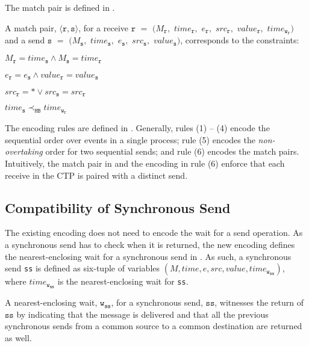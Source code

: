The match pair is defined in .
\begin{definition} \label{def:mp}
A match pair, $\langle\mathtt{r}, \mathtt{s}\rangle$, for a receive $\mathtt{r}$ $=$ $(M_\mathtt{r},$ $\mathit{time}_\mathtt{r},$ $e_\mathtt{r},$ $src_\mathtt{r},$ $\mathit{value}_\mathtt{r},$ $\mathit{time}_{\mathtt{w}_\mathtt{r}})$ and a send $\mathtt{s}$ $=$ $(M_\mathtt{s},$ $\mathit{time}_\mathtt{s},$ $e_\mathtt{s},$ $src_\mathtt{s},$ $\mathit{value}_\mathtt{s})$, corresponds to the constraints:
\begin{compactenum}
\item $M_{\mathtt{r}} = \mathit{time}_{\mathtt{s}} \wedge M_{\mathtt{s}} = \mathit{time}_{\mathtt{r}}$
\item $e_{\mathtt{r}} = e_{\mathtt{s}} \wedge \mathit{value}_{\mathtt{r}} = \mathit{value}_{\mathtt{s}}$
\item $src_\mathtt{r} = \ast \vee src_\mathtt{s} = src_\mathtt{r}$
\item $\mathit{time}_{\mathtt{s}} \prec_\mathtt{HB} \mathit{time}_{\mathtt{w_r}}$
\end{compactenum}
\end{definition}

The encoding rules are defined in . Generally, rules (1) -- (4) encode the sequential order over events in a single process; rule (5) encodes the \emph{non-overtaking} order for two sequential sends; and rule (6) encodes the match pairs. Intuitively, the match pair in  and the encoding in rule (6) enforce that each receive in the CTP is paired with a distinct send. 

\setcounter{equation}{0}
\encodingptp

\subsection{Compatibility of Synchronous Send}

The existing encoding does not need to encode the wait for a send operation. As a synchronous send has to check when it is returned, the new encoding defines the nearest-enclosing wait for a synchronous send in . As such, a synchronous send \texttt{ss} is defined as six-tuple of variables $(M,\mathit{time},e,\mathit{src},\mathit{value},\mathit{time}_\mathtt{w_{ss}})$, where $\mathit{time}_\mathtt{w_{ss}}$ is the nearest-enclosing wait for \texttt{ss}.

\begin{definition}
A nearest-enclosing wait, $\mathtt{w}_\mathtt{ss}$, for a synchronous send, $\mathtt{ss}$, witnesses the return of $\mathtt{ss}$ by indicating that the message is delivered and that all the previous synchronous sends from a common source to a common destination are returned as well.
\label{def:syncnw}
\end{definition}

